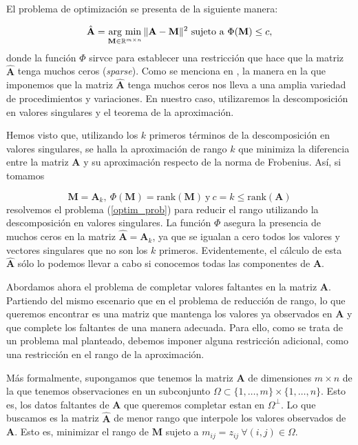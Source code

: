 \documentclass[tfg,cienciasbased,lot,lof,covers,final,overleaf,nocopyright]{tfgtfmthesisuam}
\newcommand{\argmin}{\operatornamewithlimits{arg\ min}}
\begin{document}
El problema de optimización se presenta de la siguiente manera:

\begin{equation}[optim_prob]
    \hat{\mathbf{A}} =\argmin_{\mathbf{M} \in \mathbb{R}^{m \times n}} \| \mathbf{A} - \mathbf{M} \|^2 \mathrm{\ sujeto\ a\ }\Phi(\mathbf{M}) \leq c,
\end{equation}
donde la función $\Phi$ sirvce para establecer una restricción que hace que la matriz $\hat{\mathbf{A}}$ tenga muchos ceros (\textit{sparse}). Como se menciona en \cite{Hastie}, la manera en la que imponemos que la matriz $\hat{\mathbf{A}}$ tenga muchos ceros nos lleva a una amplia variedad de procedimientos y variaciones. En nuestro caso, utilizaremos la descomposición en valores singulares y el teorema de la aproximación.

Hemos visto que, utilizando los $k$ primeros términos de la descomposición en valores singulares, se halla la aproximación de rango $k$ que minimiza la diferencia entre la matriz $\mathbf{A}$ y su aproximación respecto de la norma de Frobenius. Así, si tomamos 

\begin{equation*}
    \mathbf{M} = \mathbf{A}_k,\  \Phi(\mathbf{M}) = \mbox{rank}(\mathbf{M}) \mathrm{\ y\ } c = k \leq \mbox{rank}(\mathbf{A})
\end{equation*}
resolvemos el problema (\ref{optim_prob}) para reducir el rango utilizando la descomposición en valores singulares. La función $\Phi$ asegura la presencia de muchos ceros en la matriz $\hat{\mathbf{A}} = \mathbf{A}_k$, ya que se igualan a cero todos los valores y vectores singulares que no son los $k$ primeros. Evidentemente, el cálculo de esta $\hat{\mathbf{A}}$ sólo lo podemos llevar a cabo si conocemos todas las componentes de $\mathbf{A}$.

Abordamos ahora el problema de completar valores faltantes en la matriz $\mathbf{A}$. Partiendo del mismo escenario que en el problema de reducción de rango, lo que queremos encontrar es una matriz que mantenga los valores ya observados en $\mathbf{A}$ y que complete los faltantes de una manera adecuada. Para ello, como se trata de un problema mal planteado, debemos imponer alguna restricción adicional, como una restricción en el rango de la aproximación.

Más formalmente, supongamos que tenemos la matriz $\mathbf{A}$ de dimensiones $m \times n$ de la que tenemos observaciones en un subconjunto $\Omega \subset \{1, \ldots, m\} \times \{1, \ldots, n\}$. Esto es, los datos faltantes de $\mathbf{A}$ que queremos completar estan en $\Omega^{\bot}$. Lo que buscamos es la matriz $\hat{\mathbf{A}}$ de menor rango que interpole los valores observados de $\mathbf{A}$. Esto es, minimizar el rango de $\mathbf{M}$ sujeto a $m_{ij} = z_{ij}\ \forall (i,j) \in \Omega$.
\end{document}

